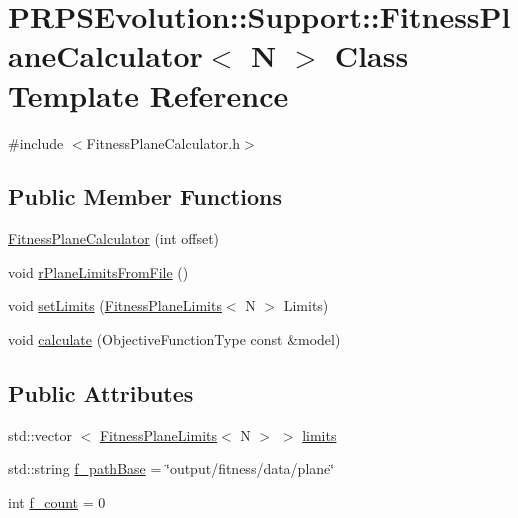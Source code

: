 \hypertarget{class_p_r_p_s_evolution_1_1_support_1_1_fitness_plane_calculator}{\section{\-P\-R\-P\-S\-Evolution\-:\-:\-Support\-:\-:\-Fitness\-Plane\-Calculator$<$ \-N $>$ \-Class \-Template \-Reference}
\label{class_p_r_p_s_evolution_1_1_support_1_1_fitness_plane_calculator}
}


{\ttfamily \#include $<$\-Fitness\-Plane\-Calculator.\-h$>$}

\subsection*{\-Public \-Member \-Functions}
\begin{DoxyCompactItemize}
\item 
\hyperlink{class_p_r_p_s_evolution_1_1_support_1_1_fitness_plane_calculator_a0701ccf267c1e389d2cf975e0d307a98}{\-Fitness\-Plane\-Calculator} (int offset)
\item 
void \hyperlink{class_p_r_p_s_evolution_1_1_support_1_1_fitness_plane_calculator_a0a11a6f84f210798240be91350d7a3a0}{r\-Plane\-Limits\-From\-File} ()
\item 
void \hyperlink{class_p_r_p_s_evolution_1_1_support_1_1_fitness_plane_calculator_a34f54b4251566494e0d1e9dd22d513be}{set\-Limits} (\hyperlink{struct_p_r_p_s_evolution_1_1_support_1_1_fitness_plane_limits}{\-Fitness\-Plane\-Limits}$<$ \-N $>$ \-Limits)
\item 
void \hyperlink{class_p_r_p_s_evolution_1_1_support_1_1_fitness_plane_calculator_aab1a3bf7d3a48d3d435536d3e32cfb21}{calculate} (\-Objective\-Function\-Type const \&model)
\end{DoxyCompactItemize}
\subsection*{\-Public \-Attributes}
\begin{DoxyCompactItemize}
\item 
std\-::vector\*
$<$ \hyperlink{struct_p_r_p_s_evolution_1_1_support_1_1_fitness_plane_limits}{\-Fitness\-Plane\-Limits}$<$ \-N $>$ $>$ \hyperlink{class_p_r_p_s_evolution_1_1_support_1_1_fitness_plane_calculator_a9caf2e6ac9dec08e8d052c57f0455f18}{limits}
\item 
std\-::string \hyperlink{class_p_r_p_s_evolution_1_1_support_1_1_fitness_plane_calculator_ac49be73b0a0e5e8642f3a328061f75cb}{f\-\_\-path\-Base} = \char`\"{}output/fitness/data/plane\char`\"{}
\item 
int \hyperlink{class_p_r_p_s_evolution_1_1_support_1_1_fitness_plane_calculator_a3caff6f9344aa5fe2acd0815b2d55bbe}{f\-\_\-count} = 0
\end{DoxyCompactItemize}
